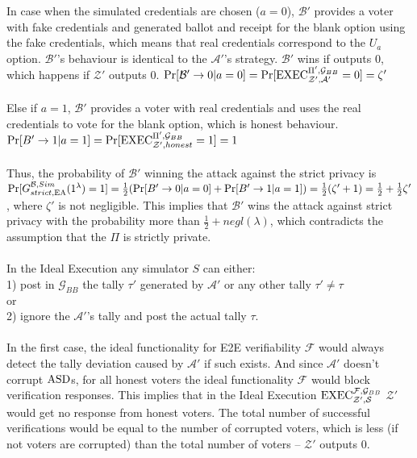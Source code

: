In case when the simulated credentials are chosen ($a=0$), $\mathcal{B'}$ provides a voter with fake credentials and generated ballot and receipt for the blank option using the fake credentials, which means that real credentials correspond to the $U_a$ option. $\mathcal{B'}$'s behaviour is identical to the $\mathcal{A'}$'s strategy. $\mathcal{B'}$ wins if outputs 0, which happens if  $\mathcal{Z'}$ outputs 0. $\Pr[\mathcal{B}'\rightarrow 0| a=0 ] = \Pr[\operatorname{EXEC}_{\mathcal{Z'},\mathcal{A'}}^{\Pi', \mathcal{G}_{BB}}=0] = \zeta'$\\\\
%
Else if $a=1$, $\mathcal{B'}$ provides a voter with real credentials and uses the real credentials to vote for the blank option, which is honest behaviour. $\Pr[B'\rightarrow 1| a=1] =\Pr[\operatorname{EXEC}_{\mathcal{Z'},honest}^{\Pi', \mathcal{G}_{BB}}=1] = 1$\\\\
%
Thus, the probability of $\mathcal{B'}$  winning the attack against the strict privacy is \\$\Pr[G_{strict,\operatorname{EA}}^{\mathcal{B}, Sim}(1^{\lambda})=1]= \frac{1}{2}(\Pr[B'\rightarrow 0| a=0] + \Pr[B'\rightarrow 1| a=1])  = \frac{1}{2} (\zeta' +1) =  \frac{1}{2}  +  \frac{1}{2} \zeta'$ , where $\zeta'$ is not negligible. This implies that $\mathcal{B'}$ wins the attack against strict privacy with the probability more than $\frac{1}{2} + negl(\lambda)$, which contradicts the assumption that the $\Pi$ is strictly private.\\\\
In the Ideal Execution any simulator $S$ can either:\\
1) post in $\mathcal{G}_{BB}$ the tally $\tau'$ generated by $\mathcal{A'}$ or any other tally  $\tau' \neq \tau$\\ 
or\\
2) ignore the $\mathcal{A'}$'s tally and post the actual tally $\tau$.\\\\
In the first case, the ideal functionality for E2E verifiability  $\mathcal{F}$  would always detect the tally deviation caused by $\mathcal{A'}$ if such exists. And since  $\mathcal{A'}$ doesn't corrupt $\operatorname{ASD}$s, for all honest voters the ideal functionality $\mathcal{F}$ would block verification responses. This implies that in the Ideal Execution $\operatorname{EXEC}_{\mathcal{Z'}, \mathcal{S}}^{\mathcal{F}, \mathcal{G}_{BB}}$ $\mathcal{Z'}$ would get no response from honest voters. The total number of successful verifications would be equal to the number of corrupted voters, which is less (if not voters are corrupted) than the total number of voters -- $\mathcal{Z'}$ outputs 0.  \\\\
